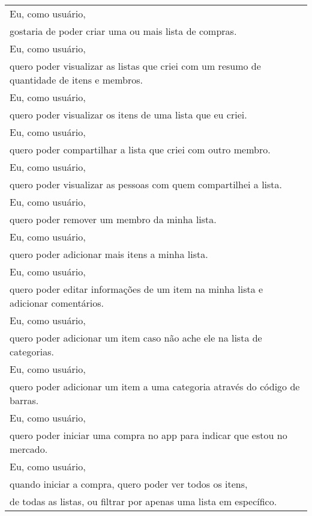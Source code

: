 \begin{quadro}[H]
{\begin{tabular}{|l|}
Eu, como usuário, \\ gostaria de poder criar uma ou mais lista de compras.                                                                       \\ \hline
Eu, como usuário, \\ quero poder visualizar as listas que criei com um resumo de quantidade de itens e membros.                                  \\ \hline
Eu, como usuário, \\ quero poder visualizar os itens de uma lista que eu criei.                                                                  \\ \hline
Eu, como usuário, \\ quero poder compartilhar a lista que criei com outro membro.                                                                \\ \hline
Eu, como usuário, \\ quero poder visualizar as pessoas com quem compartilhei a lista.                                                            \\ \hline
Eu, como usuário, \\ quero poder remover um membro da minha lista.                                                                               \\ \hline
Eu, como usuário, \\ quero poder adicionar mais itens a minha lista.                                                                             \\ \hline
Eu, como usuário, \\ quero poder editar informações de um item na minha lista e adicionar comentários.                                           \\ \hline
Eu, como usuário, \\ quero poder adicionar um item caso não ache ele na lista de categorias.                                                     \\ \hline
Eu, como usuário, \\ quero poder adicionar um item a uma categoria através do código de barras.                                                  \\ \hline
Eu, como usuário, \\ quero poder iniciar uma compra no app para indicar que estou no mercado.                                                    \\ \hline
Eu, como usuário, \\ quando iniciar a compra, quero poder ver todos os itens, \\ de todas as listas, ou filtrar por apenas uma lista em específico. \\ \hline

\end{tabular}}
\end{quadro}
